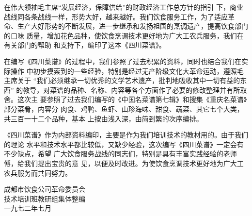 \begin{center}
\Large\bfseries
{}
\end{center}

在伟大领袖毛主席{\sffamily“发展经济，保障供给”}的财政经济工作总方针的指引
下，商业战线同各条战线一样，形势大好，越来越好。我们饮食服务工作，为了适应革
命、生产大好形势的不断发展，进一步继承和发扬祖国的烹调遗产，提高饮食部门的口味
质量，增加花色品种，使饮食烹调技术更好地为广大工农兵服务，我们在有关部门的帮助
和支持下，编印了这本《四川菜谱》。

在编写《四川菜谱》的过程中，我们参照了过去积累的资料，同时也结合我们在实际操作
中初步摸索到的一些经验，特别是经过无产阶级文化大革命运动，遵照毛主席关于%
{\sffamily“我们必须继承一切优秀的文学艺术遗产，批判地吸收其中一切有益的东西”}%
的教导，对菜谱的品种、名称、内容等各个方面作了必要的修改整理并有所取舍。这次主
要参照了过去我们编写的《中国名菜谱第七辑》和搜集《重庆名菜谱》部分菜肴，内容分
肉食、鸡鸭、鱼虾、山珍海味、甜食、蔬菜、其它七个大类，共三百一十二个品种，基本
上按由浅入深，由简到繁的次序编排。

《四川菜谱》作为内部资料编印，主要是作为我们培训技术的教材用的。由于我们的理论
水平和技术水平都比较低，又缺少经验，这次编写《四川菜谱》一定会有不少缺点，希望
广大饮食服务战线的同志们，特别是具有丰富实践经验的老师傅，给我们提出宝贵的意
见，以便及时改进。为使饮食烹调技术更好地为广大工农兵服务而共同努力。

\begin{flushright}
成都市饮食公司革命委员会%
	\mbox{\hspace{2em}}\\
技术培训班教研组集体整编%
	\mbox{\hspace{2em}}\\
一九七二年七月%
	\mbox{\hspace{4em}}
\end{flushright}

